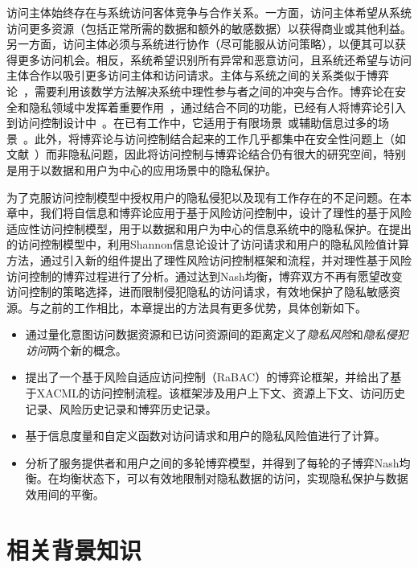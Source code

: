 访问主体始终存在与系统访问客体竞争与合作关系。一方面，访问主体希望从系统访问更多资源（包括正常所需的数据和额外的敏感数据）以获得商业或其他利益。另一方面，访问主体必须与系统进行协作（尽可能服从访问策略），以便其可以获得更多访问机会。相反，系统希望识别所有异常和恶意访问，且系统还希望与访问主体合作以吸引更多访问主体和访问请求。主体与系统之间的关系类似于博弈论~\cite{gibbons1992game}，需要利用该数学方法解决系统中理性参与者之间的冲突与合作。博弈论在安全和隐私领域中发挥着重要作用~\cite{do2017game,zhu2018game}，通过结合不同的功能，已经有人将博弈论引入到访问控制设计中~\cite{hu2014game,zhang2015towards,liu2016dynamic,gao2018game, helil2017non}。在已有工作中，它适用于有限场景~\cite{hu2014game,gao2018game}或辅助信息过多的场景~\cite{zhang2015towards,liu2016dynamic,helil2017non}。此外，将博弈论与访问控制结合起来的工作几乎都集中在安全性问题上（如文献~\cite{helil2017non}）而非隐私问题，因此将访问控制与博弈论结合仍有很大的研究空间，特别是用于以数据和用户为中心的应用场景中的隐私保护。

为了克服访问控制模型中授权用户的隐私侵犯以及现有工作存在的不足问题。在本章中，我们将自信息和博弈论应用于基于风险访问控制中，设计了理性的基于风险适应性访问控制模型，用于以数据和用户为中心的信息系统中的隐私保护。在提出的访问控制模型中，利用Shannon信息论设计了访问请求和用户的隐私风险值计算方法，通过引入新的组件提出了理性风险访问控制框架和流程，并对理性基于风险访问控制的博弈过程进行了分析。通过达到Nash均衡，博弈双方不再有愿望改变访问控制的策略选择，进而限制侵犯隐私的访问请求，有效地保护了隐私敏感资源。与之前的工作相比，本章提出的方法具有更多优势，具体创新如下。

\begin{itemize}
	
	\item 通过量化意图访问数据资源和已访问资源间的距离定义了\textit{隐私风险}和\textit{隐私侵犯访问}两个新的概念。
	\item 提出了一个基于风险自适应访问控制（RaBAC）的博弈论框架，并给出了基于XACML的访问控制流程。该框架涉及用户上下文、资源上下文、访问历史记录、风险历史记录和博弈历史记录。
	\item 基于信息度量和自定义函数对访问请求和用户的隐私风险值进行了计算。
	\item 分析了服务提供者和用户之间的多轮博弈模型，并得到了每轮的子博弈Nash均衡。在均衡状态下，可以有效地限制对隐私数据的访问，实现隐私保护与数据效用间的平衡。
\end{itemize}


\section{相关背景知识}
\label{sec:preliminaries}

